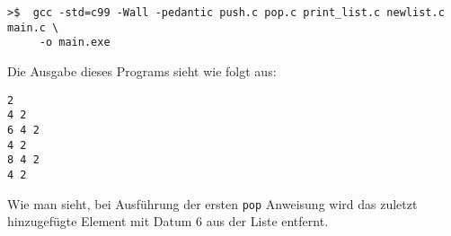 \vspace*{0.5cm}
\begin{verbatim}
>$  gcc -std=c99 -Wall -pedantic push.c pop.c print_list.c newlist.c main.c \
     -o main.exe
\end{verbatim}
\vspace*{0.5cm}

\noindent Die Ausgabe dieses Programs sieht wie folgt aus:
\begin{verbatim}
2	
4 2
6 4 2	
4 2
8 4 2	
4 2
\end{verbatim}
Wie man sieht, bei Ausführung der ersten \texttt{pop} Anweisung wird das zuletzt hinzugefügte Element mit Datum $6$ aus der Liste entfernt.

\endinput

